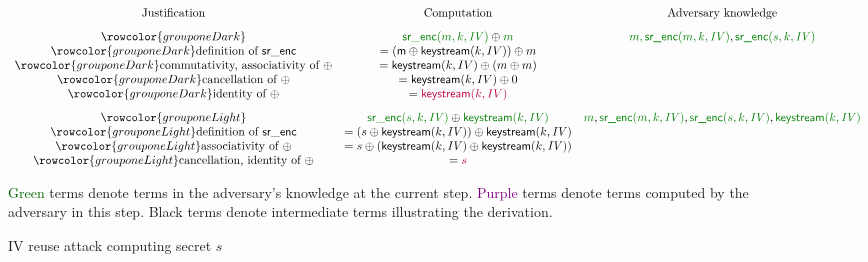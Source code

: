 \documentclass{article}
\theoremstyle{definition}
\newcommand{\green}[1]{\textcolor{darkgreen}{#1}}
\newcommand{\purple}[1]{\textcolor{purple}{#1}}
\begin{document}
\begin{figure}
    
{\footnotesize

$
\begin{array}{ccc}
  \text{Justification} & \text{Computation}   & \text{Adversary knowledge} \\[.8em]
  \rowcolor{grouponeDark}
  & \green{\mathsf{sr\_enc}(m,k,\mathit{IV})} \oplus \green{m}  & \green{m, \textsf{sr\_enc}(m, k, \mathit{IV})}, \green{\textsf{sr\_enc}(s,k,\mathit{IV})} \\

\rowcolor{grouponeDark}
\text{definition of }\mathsf{sr\_enc} & = (\mathsf{m} \oplus \mathsf{keystream}(k, IV)) \oplus m& \\

\rowcolor{grouponeDark}
\text{commutativity, associativity of }\oplus & = \mathsf{keystream}(k, IV) \oplus (m \oplus m)& \\

\rowcolor{grouponeDark}
\text{cancellation of }\oplus & = \mathsf{keystream}(k, IV) \oplus 0& \\
 
\rowcolor{grouponeDark}
\text{identity of }\oplus & = \purple{\mathsf{keystream}(k, IV)}& \\[.8em]

  \rowcolor{grouponeLight}
  &
  \green{\mathsf{sr\_enc}(s, k, \mathit{IV})} \oplus \green{\mathsf{keystream}(k, \mathit{IV})}    
      & \green{m}, \green{\textsf{sr\_enc}(m, k, \mathit{IV})}, \green{\textsf{sr\_enc}(s,k,\mathit{IV})}, \green{\mathsf{keystream}(k,\mathit{IV})} \\
    \rowcolor{grouponeLight}

  \text{definition of }\mathsf{sr\_enc} &  
  = (s \oplus \mathsf{keystream}(k, \mathit{IV})) \oplus \mathsf{keystream}(k, \mathit{IV}) &  \\ 
  \rowcolor{grouponeLight}
   \text{associativity of }\oplus & 
   = s \oplus (\mathsf{keystream}(k, \mathit{IV}) \oplus \mathsf{keystream}(k, \mathit{IV})) &  \\ 
   \rowcolor{grouponeLight}
   \text{cancellation, identity of }\oplus & 
   = \purple{s}  &  \\ 
\end{array}
$
    
\vspace{.3em}
\green{Green} terms denote terms in the adversary's knowledge at the current step. \newline
\purple{Purple} terms denote terms computed by the adversary in this step. \newline
Black terms denote intermediate terms illustrating the derivation.
\caption{IV reuse attack computing secret $s$}\label{fig:d}
}
\end{figure}
\end{document}

